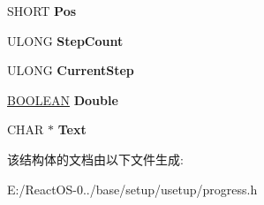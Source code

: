\begin{DoxyCompactItemize}
S\+H\+O\+RT {\bfseries Pos}
\item 
\mbox{\label{struct___p_r_o_g_r_e_s_s_a8e920d14d0908de4829cdb2de217e733}} 
U\+L\+O\+NG {\bfseries Step\+Count}
\item 
\mbox{\label{struct___p_r_o_g_r_e_s_s_a79dcd241c341f0b763cac1d19f83d752}} 
U\+L\+O\+NG {\bfseries Current\+Step}
\item 
\mbox{\label{struct___p_r_o_g_r_e_s_s_aeb789c3b6ade5b8afcad31d41eb7bcb2}} 
\hyperlink{_processor_bind_8h_a112e3146cb38b6ee95e64d85842e380a}{B\+O\+O\+L\+E\+AN} {\bfseries Double}
\item 
\mbox{\label{struct___p_r_o_g_r_e_s_s_aba4b36dbc0611bfd10fc6c10de611204}} 
C\+H\+AR $\ast$ {\bfseries Text}
\end{DoxyCompactItemize}


该结构体的文档由以下文件生成\+:\begin{DoxyCompactItemize}
\item 
E\+:/\+React\+O\+S-\/0../base/setup/usetup/progress.\+h\end{DoxyCompactItemize}
